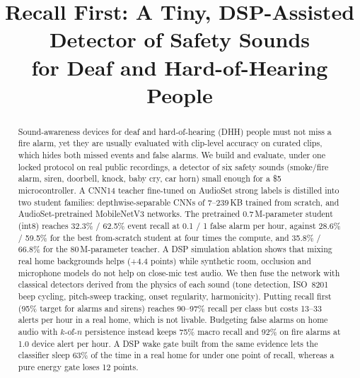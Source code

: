 \documentclass[conference]{IEEEtran}
\begin{document}
\title{Recall First: A Tiny, DSP-Assisted Detector of Safety Sounds\\for Deaf and Hard-of-Hearing People}
\author{}
\maketitle

\begin{abstract}
Sound-awareness devices for deaf and hard-of-hearing (DHH) people must not miss a fire alarm,
yet they are usually evaluated with clip-level accuracy on curated clips, which hides both
missed events and false alarms. We build and evaluate, under one locked protocol on real public
recordings, a detector of six safety sounds (smoke/fire alarm, siren, doorbell, knock, baby cry,
car horn) small enough for a \$5 microcontroller. A CNN14 teacher fine-tuned on AudioSet strong
labels is distilled into two student families: depthwise-separable CNNs of 7--239\,KB trained
from scratch, and AudioSet-pretrained MobileNetV3 networks. The pretrained 0.7\,M-parameter
student (int8) reaches 32.3\% / 62.5\% event recall at 0.1 / 1 false alarm per hour, against
28.6\% / 59.5\% for the best from-scratch student at four times the compute, and 35.8\% / 66.8\%
for the 80\,M-parameter teacher. A DSP simulation ablation shows that mixing real home
backgrounds helps (+4.4 points) while synthetic room, occlusion and microphone models do not help
on close-mic test audio. We then fuse the network with classical detectors derived from the
physics of each sound (tone detection, ISO~8201 beep cycling, pitch-sweep tracking, onset
regularity, harmonicity). Putting recall first (95\% target for alarms and sirens) reaches
90--97\% recall per class but costs 13--33 alerts per hour in a real home, which is not livable.
Budgeting false alarms on home audio with $k$-of-$n$ persistence instead keeps 75\% macro recall
and 92\% on fire alarms at 1.0 device alert per hour. A DSP wake gate built from the same
evidence lets the classifier sleep 63\% of the time in a real home for under one point of recall,
whereas a pure energy gate loses 12 points.
\end{abstract}
\end{document}
